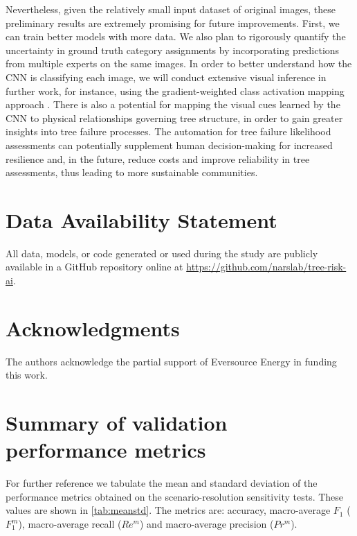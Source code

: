 \documentclass[Journal, letterpaper, DoubleSpace, InsideFigs]{ascelike-new}
\begin{document}
Nevertheless, given the relatively small input dataset of original images, these preliminary results are extremely
promising for future improvements.  First, we can train better models with more data.  We also plan to rigorously
quantify the uncertainty in ground truth category assignments by incorporating predictions from multiple experts on the
same images.  In order to better understand how the CNN is classifying each image, we will conduct extensive visual
inference in further work, for instance, using the gradient-weighted class activation mapping approach
\cite{zeiler2014visualizing}.  There is also a potential for mapping the visual cues learned by the CNN to physical
relationships governing tree structure, in order to gain greater insights into tree failure processes.  The automation
for tree failure likelihood assessments can potentially supplement human decision-making for increased resilience and,
in the future, reduce costs and improve reliability in tree assessments, thus leading to more sustainable communities.


\section{Data Availability Statement}
All data, models, or code generated or used during the study are publicly available in a GitHub repository online at \url{https://github.com/narslab/tree-risk-ai}.

\section{Acknowledgments}
The authors acknowledge the partial support of Eversource Energy in funding this work.

\appendix
\section{Summary of validation performance metrics}
For further reference we tabulate the mean and standard deviation of the performance metrics obtained on the scenario-resolution sensitivity tests. These values are shown in \autoref{tab:meanstd}.
The metrics are: accuracy, macro-average $F_1$ ($F_1^m$), macro-average recall ($Re^m$) and macro-average precision ($Pr^m$).
\end{document}
